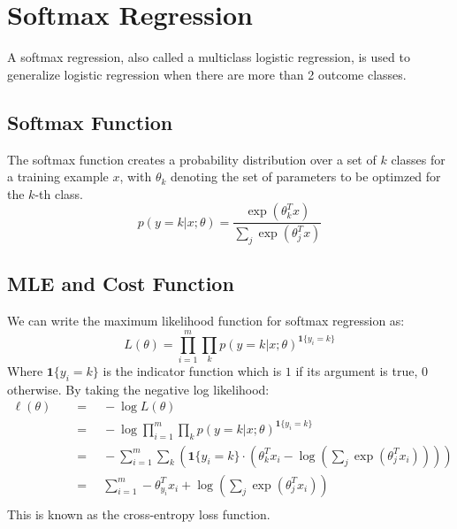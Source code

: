 \documentclass[twoside,twocolumn]{article}
\begin{document}
\section{Softmax Regression}
A softmax regression, also called a multiclass logistic regression, is
used to generalize logistic regression when there are more than 2 outcome
classes.
\subsection{Softmax Function}
The softmax function creates a probability distribution over a set of $k$
classes for a training example $x$, with $\theta_k$ denoting the set of
parameters to be optimzed for the $k$-th class.
\begin{equation}
  p(y=k | x; \theta) = \frac{\exp \left(\theta_k^T x \right)}{\sum_j \exp \left( \theta_j^T x \right)}
\end{equation}
\subsection{MLE and Cost Function}
We can write the maximum likelihood function for softmax regression as:
\begin{equation}
  L(\theta) = \prod_{i=1}^m \prod_k p(y=k|x; \theta)^{\mathbf{1}\{y_i=k\}}
\end{equation}
Where $\mathbf{1} \{y_i=k\}$ is the indicator function which is $1$ if its
argument is true, $0$ otherwise.
By taking the negative log likelihood:
\begin{equation}
  \begin{aligned}
    \ell ( \theta ) \quad & = \quad -\log L ( \theta ) \\
    & = \quad - \log \prod_{i=1}^m \prod_k p(y=k|x; \theta)^{\mathbf{1}\{y_i=k\}} \\
    & = \quad -\sum_{i=1}^m \sum_k \left( \mathbf{1}\{y_i=k\} \cdot \left( \theta^T_k x_i - \log \left( \sum_j \exp \left( \theta_j^T x_i \right) \right) \right) \right) \\
    & = \quad \sum_{i=1}^m -\theta^T_{y_i} x_i + \log \left( \sum_j \exp \left( \theta_j^T x_i \right) \right) \\
  \end{aligned}
\end{equation}
This is known as the cross-entropy loss function.
\end{document}
